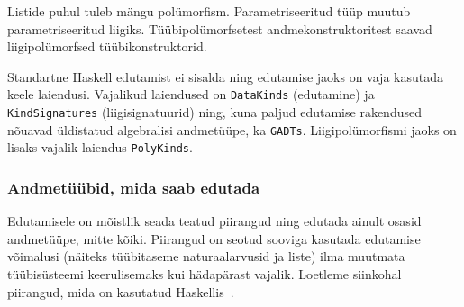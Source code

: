 \documentclass[12pt]{article}
\begin{document}
        Listide puhul tuleb mängu polümorfism. Parametriseeritud tüüp muutub parametriseeritud liigiks. Tüübipolümorfsetest andmekonstruktoritest saavad liigipolümorfsed tüübikonstruktorid.

        Standartne Haskell edutamist ei sisalda ning edutamise jaoks on vaja kasutada keele laiendusi. Vajalikud laiendused on \verb!DataKinds! (edutamine) ja \verb!KindSignatures! (liigisignatuurid) ning, kuna paljud edutamise rakendused nõuavad üldistatud algebralisi andmetüüpe, ka \verb!GADTs!. Liigipolümorfismi jaoks on lisaks vajalik laiendus \verb!PolyKinds!.
      \subsubsection{Andmetüübid, mida saab edutada}\label{kitsendused}
        Edutamisele on mõistlik seada teatud piirangud ning edutada ainult osasid andmetüüpe, mitte kõiki. Piirangud on seotud sooviga kasutada edutamise võimalusi (näiteks tüübitaseme naturaalarvusid ja liste) ilma muutmata tüübisüsteemi keerulisemaks kui hädapärast vajalik. Loetleme siinkohal piirangud, mida on kasutatud Haskellis~\cite{Giv}.
\end{document}
